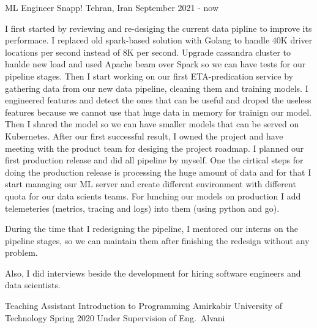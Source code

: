\begin{cventries}
  \cventry
    {ML Engineer} %
    {Snapp!} %
    {Tehran, Iran} %
    {September 2021 - now} %
    {
      I first started by reviewing and re-desiging the current data pipline to improve its performace.
      I replaced old spark-based solution with Golang to handle 40K driver locations per second instead of
      8K per second. Upgrade cassandra cluster to hanlde new load and used Apache beam over Spark so we can
      have tests for our pipeline stages. Then I start working on our first ETA-predication service by gathering data
      from our new data pipeline, cleaning them and training models. I engineered features and detect the ones that can
      be useful and droped the useless features because we cannot use that huge data in memory for trainign our model.
      Then I shared the model so we can have smaller models that can be served on Kubernetes.
      After our first successful result, I owned the project and have meeting with the product team for desiging
      the project roadmap. I planned our first production release and did all pipeline by myself.
      One the cirtical steps for doing the production release is processing the huge amount of data and for that I
      start managing our ML server and create different environment with different quota for our data scients teams.
      For lunching our models on production I add telemeteries (metrics, tracing and logs) into them (using python and go).

      During the time that I redesigning the pipeline, I mentored our interns on the pipeline stages, so we can maintain
      them after finishing the redesign without any problem.

      Also, I did interviews beside the development for hiring software engineers and data scientists.
    }

\end{cventries}


\begin{cventries}

  \cventry
    {Teaching Assistant} %
    {Introduction to Programming} %
    {Amirkabir University of Technology} %
    {Spring 2020} %
    {Under Supervision of Eng.~Alvani}


\end{cventries}
